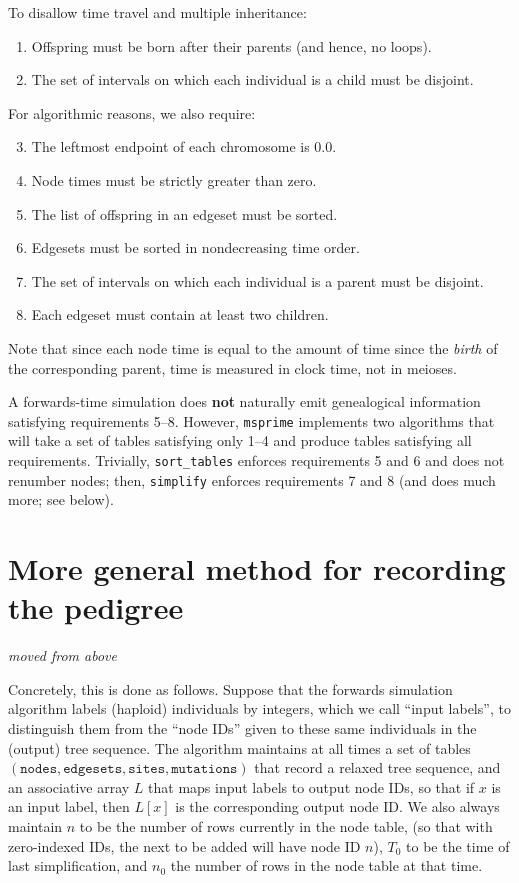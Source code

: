 \documentclass{article}
\newcommand{\msprime}{\texttt{msprime}}
\newcommand{\nodes}{\texttt{nodes}}
\newcommand{\edgesets}{\texttt{edgesets}}
\newcommand{\sites}{\texttt{sites}}
\newcommand{\mutations}{\texttt{mutations}}
\newcommand{\plr}[1]{{\em \color{blue} #1}}
\begin{document}
To disallow time travel and multiple inheritance:
\begin{enumerate}
    \item Offspring must be born after their parents (and hence, no loops).
    \item The set of intervals on which each individual is a child must be disjoint.
\end{enumerate}
For algorithmic reasons, we also require:
\begin{enumerate} \setcounter{enumi}{2}
    \item The leftmost endpoint of each chromosome is 0.0.
    \item Node times must be strictly greater than zero.
    \item The list of offspring in an edgeset must be sorted.
    \item Edgesets must be sorted in nondecreasing time order.
    \item The set of intervals on which each individual is a parent must be disjoint.
    \item Each edgeset must contain at least two children.
\end{enumerate}
Note that since each node time is equal to the amount of time since the \emph{birth} of the
corresponding parent, time is measured in clock time, not in meioses.

A forwards-time simulation does \textbf{not} naturally emit genealogical information
satisfying requirements 5--8.
However, \msprime{} implements two algorithms that will take a set of tables
satisfying only 1--4 and produce tables satisfying all requirements.
Trivially, \texttt{sort\_tables} enforces requirements 5 and 6 and does not renumber nodes;
then, \texttt{simplify} enforces requirements 7 and 8 (and does much more; see below).


\section{More general method for recording the pedigree}

\plr{moved from above}

Concretely, this is done as follows.
Suppose that the forwards simulation algorithm labels (haploid) individuals by integers,
which we call ``input labels'',
to distinguish them from the ``node IDs'' given to these same individuals in the (output) tree sequence.
The algorithm maintains at all times a set of tables $(\nodes, \edgesets, \sites, \mutations)$
that record a relaxed tree sequence,
and an associative array $L$ that maps input labels to output node IDs, so that if $x$ is an input label,
then $L[x]$ is the corresponding output node ID.
We also always maintain $n$ to be the number of rows currently in the node table,
(so that with zero-indexed IDs, the next to be added will have node ID $n$),
$T_0$ to be the time of last simplification,
and $n_0$ the number of rows in the node table at that time.
\end{document}
